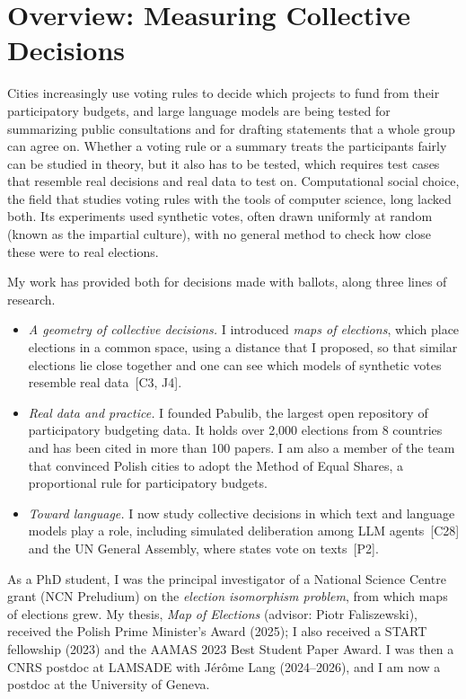 \documentclass[11pt,a4paper]{article}
\newcommand{\pub}[1]{~[#1]}
\begin{document}
\headercontactfalse
{}

\section{Overview: Measuring Collective Decisions}

Cities increasingly use voting rules to decide which projects to fund from
their participatory budgets, and large language models are being tested for
summarizing public consultations and for drafting statements that a whole
group can agree on. Whether a voting rule or a summary treats the
participants fairly can be studied in theory, but it also has to be tested,
which requires test cases that resemble real decisions and real data to test
on. Computational social choice, the
field that studies voting rules with the tools of computer science, long
lacked both. Its experiments used synthetic votes, often drawn uniformly at
random (known as the impartial culture), with no general method to check how
close these were to real elections.

My work has provided both for decisions made with ballots, along three lines
of research.
\begin{itemize}
  \item \emph{A geometry of collective decisions.} I introduced \emph{maps of
  elections}, which place elections in a common space, using a distance that I
  proposed, so that similar elections lie close together and one can see
  which models of synthetic votes resemble real data\pub{C3, J4}.
  \item \emph{Real data and practice.} I founded Pabulib, the
  largest open repository of participatory budgeting data. It holds over
  2{,}000 elections from 8 countries and has been cited in more than 100
  papers. I am also a member of the team that convinced Polish cities to adopt
  the Method of Equal Shares, a proportional rule for participatory budgets.
  \item \emph{Toward language.} I now study collective decisions in which text
  and language models play a role, including simulated deliberation among LLM
  agents\pub{C28} and the UN General Assembly, where states vote on
  texts\pub{P2}.
\end{itemize}
As a PhD student, I was the principal investigator of a National Science
Centre grant (NCN Preludium) on the \emph{election isomorphism problem}, from
which maps of elections grew. My thesis, \emph{Map of Elections} (advisor:
Piotr Faliszewski), received the Polish Prime Minister's Award (2025); I also
received a START fellowship (2023) and the AAMAS 2023 Best Student Paper
Award. I was then a CNRS postdoc at LAMSADE with J\'er\^ome Lang (2024--2026),
and I am now a postdoc at the University of Geneva.
\end{document}
